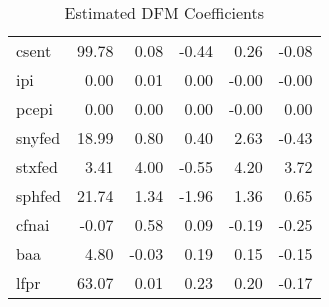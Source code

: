 \documentclass[11pt, letterpaper]{article}\usepackage[]{graphicx}\usepackage[]{color}
\begin{document}
\begin{table}[H]
\begin{tabular}{lrrrrr}
  csent & 99.78 & 0.08 & -0.44 & 0.26 & -0.08 \\ 
  ipi & 0.00 & 0.01 & 0.00 & -0.00 & -0.00 \\ 
  pcepi & 0.00 & 0.00 & 0.00 & -0.00 & 0.00 \\ 
  snyfed & 18.99 & 0.80 & 0.40 & 2.63 & -0.43 \\ 
  stxfed & 3.41 & 4.00 & -0.55 & 4.20 & 3.72 \\ 
  sphfed & 21.74 & 1.34 & -1.96 & 1.36 & 0.65 \\ 
  cfnai & -0.07 & 0.58 & 0.09 & -0.19 & -0.25 \\ 
  baa & 4.80 & -0.03 & 0.19 & 0.15 & -0.15 \\ 
  lfpr & 63.07 & 0.01 & 0.23 & 0.20 & -0.17 \\ 
   \hline
\end{tabular}
\endgroup
\caption{Estimated DFM Coefficients} 
\end{table}
\end{document}
